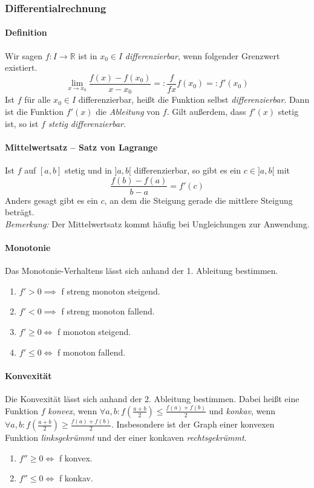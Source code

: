 \documentclass[a4paper, 9pt, DIV=24]{scrartcl}
\newcommand{\R}{\mathbb{R}}
\begin{document}
\subsubsection{Differentialrechnung}

\paragraph{Definition}
Wir sagen $f: I \rightarrow \R$ ist in $x_0 \in I$ \emph{differenzierbar}, wenn folgender Grenzwert existiert.
\[
 \lim_{x\rightarrow x_0} \dfrac{f(x) - f(x_0)}{x - x_0} =: \dfrac{f}{fx} f(x_0) =: f'(x_0)
\]
Ist $f$ für alle $x_0 \in I$ differenzierbar, heißt die Funktion selbst \emph{differenzierbar}.
Dann ist die Funktion $f'(x)$ die \emph{Ableitung} von $f$.
Gilt außerdem, dass $f'(x)$ stetig ist, so ist $f$ \emph{stetig differenzierbar}.

\paragraph{Mittelwertsatz -- Satz von Lagrange}
Ist $f$ auf $[a,b]$ stetig und in $]a,b[$ differenzierbar, so gibt es ein $c \in ]a,b[$ mit
\[ \dfrac{f(b) - f(a)}{b-a} = f'(c) \]
Anders gesagt gibt es ein $c$, an dem die Steigung gerade die mittlere Steigung beträgt.\\
\emph{Bemerkung:} Der Mittelwertsatz kommt häufig bei Ungleichungen zur Anwendung.

\paragraph{Monotonie}
Das Monotonie-Verhaltens lässt sich anhand der 1. Ableitung bestimmen.
\begin{enumerate}[label={(}\arabic*{)}]
 \item $f' > 0 \implies $ f streng monoton steigend.
 \item $f' < 0 \implies $ f streng monoton fallend.
 \item $f' \geq 0 \iff $ f monoton steigend.
 \item $f' \leq 0 \iff $ f monoton fallend.
\end{enumerate}

\paragraph{Konvexität}
Die Konvexität lässt sich anhand der 2. Ableitung bestimmen.
Dabei heißt eine Funktion $f$ \emph{konvex}, wenn $\forall a,b: f(\frac{a+b}{2}) \leq \frac{f(a)+f(b)}{2}$
und \emph{konkav}, wenn $\forall a,b: f(\frac{a+b}{2}) \geq \frac{f(a)+f(b)}{2}$.
Insbesondere ist der Graph einer konvexen Funktion \emph{linksgekrümmt} und der einer konkaven \emph{rechtsgekrümmt}.
\begin{enumerate}[label={(}\arabic*{)}]
 \item $f'' \geq 0 \iff $ f konvex.
 \item $f'' \leq 0 \iff $ f konkav.
\end{enumerate}
\end{document}
